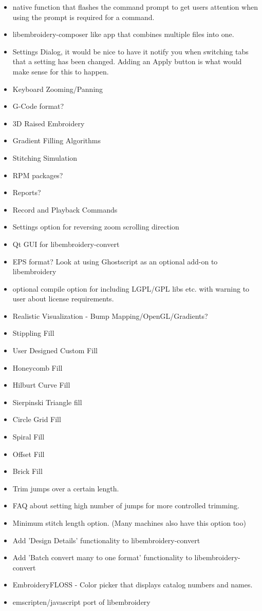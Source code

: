 \documentclass[a4paper]{report}
\begin{document}
\begin{itemize}
\item native function that flashes the command prompt to get users attention when using the
prompt is required for a command.
\item libembroidery-composer like app that combines multiple files into one.
\item Settings Dialog, it would be nice to have it notify you when switching tabs that a
setting has been changed. Adding an Apply button is what would make sense for this to happen.
\item Keyboard Zooming/Panning
\item G-Code format?
\item 3D Raised Embroidery
\item Gradient Filling Algorithms
\item Stitching Simulation
\item RPM packages?
\item Reports?
\item Record and Playback Commands
\item Settings option for reversing zoom scrolling direction
\item Qt GUI for libembroidery-convert
\item EPS format? Look at using Ghostscript as an optional add-on to libembroidery
\item optional compile option for including LGPL/GPL libs etc. with warning to user about license requirements.
\item Realistic Visualization - Bump Mapping/OpenGL/Gradients?
\item Stippling Fill
\item User Designed Custom Fill
\item Honeycomb Fill
\item Hilburt Curve Fill
\item Sierpinski Triangle fill
\item Circle Grid Fill
\item Spiral Fill
\item Offset Fill
\item Brick Fill
\item Trim jumps over a certain length.
\item FAQ about setting high number of jumps for more controlled trimming.
\item Minimum stitch length option. (Many machines also have this option too)
\item Add 'Design Details' functionality to libembroidery-convert
\item Add 'Batch convert many to one format' functionality to libembroidery-convert
\item EmbroideryFLOSS - Color picker that displays catalog numbers and names.
\item emscripten/javascript port of libembroidery
\end{itemize}
\end{document}
